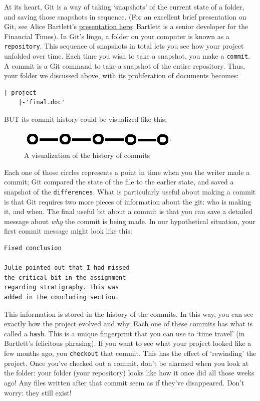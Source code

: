 \documentclass[english,]{book}
\begin{document}
At its heart, Git is a way of taking `snapshots' of the current state of
a folder, and saving those snapshots in sequence. (For an excellent
brief presentation on Git, see Alice Bartlett's
\href{https://speakerdeck.com/alicebartlett/git-for-humans}{presentation
here}; Bartlett is a senior developer for the Financial Times). In Git's
lingo, a folder on your computer is known as a \texttt{repository}. This
sequence of snapshots in total lets you see how your project unfolded
over time. Each time you wish to take a snapshot, you make a
\texttt{commit}. A commit is a Git command to take a snapshot of the
entire repository. Thus, your folder we discussed above, with its
proliferation of documents becomes:

\begin{verbatim}
|-project
    |-'final.doc'
\end{verbatim}

BUT its commit history could be visualized like this:

\begin{figure}[htbp]
\centering
\includegraphics{images/commit-history.png}
\caption{A visualization of the history of commits}
\end{figure}

Each one of those circles represents a point in time when you the writer
made a commit; Git compared the state of the file to the earlier state,
and saved a snapshot of the \texttt{differences}. What is particularly
useful about making a commit is that Git requires two more pieces of
information about the git: who is making it, and when. The final useful
bit about a commit is that you can save a detailed message about
\emph{why} the commit is being made. In our hypothetical situation, your
first commit message might look like this:

\begin{verbatim}
Fixed conclusion

Julie pointed out that I had missed 
the critical bit in the assignment 
regarding stratigraphy. This was 
added in the concluding section.
\end{verbatim}

This information is stored in the history of the commits. In this way,
you can see exactly how the project evolved and why. Each one of these
commits has what is called a \texttt{hash}. This is a unique fingerprint
that you can use to `time travel' (in Bartlett's felicitous phrasing).
If you want to see what your project looked like a few months ago, you
\texttt{checkout} that commit. This has the effect of `rewinding' the
project. Once you've checked out a commit, don't be alarmed when you
look at the folder: your folder (your repository) looks like how it once
did all those weeks ago! Any files written after that commit seem as if
they've disappeared. Don't worry: they still exist!
\end{document}
